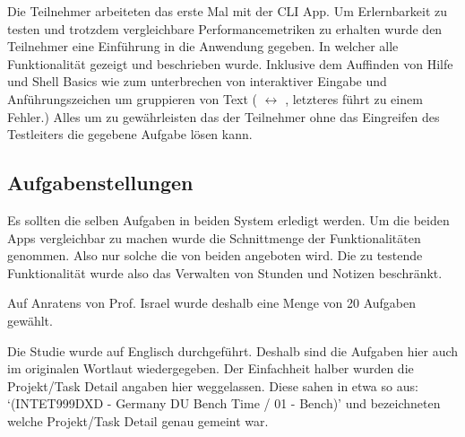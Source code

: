 \documentclass[oneside,bibliography=totocnumbered,BCOR=5mm]{scrbook}
\begin{document}
Die Teilnehmer arbeiteten das erste Mal mit der CLI App. Um Erlernbarkeit
zu testen und trotzdem vergleichbare Performancemetriken zu erhalten wurde
den Teilnehmer eine Einführung in die Anwendung gegeben. In welcher alle
Funktionalität gezeigt und beschrieben wurde. Inklusive dem Auffinden von Hilfe
und Shell Basics wie  zum unterbrechen von interaktiver
Eingabe und Anführungszeichen um gruppieren von Text ( $\leftrightarrow$ , letzteres führt zu einem
Fehler.) Alles um zu gewährleisten das der Teilnehmer ohne das Eingreifen des
Testleiters die gegebene Aufgabe lösen kann.

\subsection{Aufgabenstellungen}
\label{aufgaben}

Es sollten die selben Aufgaben in beiden System erledigt werden. Um die beiden
Apps vergleichbar zu machen wurde die Schnittmenge der Funktionalitäten
genommen. Also nur solche die von beiden angeboten wird. Die zu testende
Funktionalität wurde also das Verwalten von Stunden und Notizen beschränkt.

Auf Anratens von Prof. Israel wurde deshalb eine
Menge von 20 Aufgaben gewählt.

Die Studie wurde auf Englisch durchgeführt. Deshalb sind die Aufgaben hier
auch im originalen Wortlaut wiedergegeben. Der Einfachheit halber wurden die
Projekt/Task Detail angaben hier weggelassen. Diese sahen in etwa so aus:
`(INTET999DXD - Germany DU Bench Time / 01 - Bench)' und bezeichneten welche
Projekt/Task Detail genau gemeint war.
\end{document}

